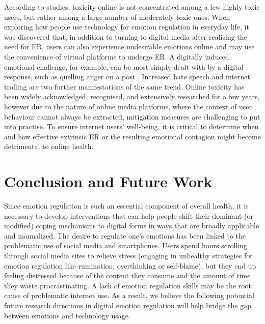 \documentclass[lettersize,journal]{IEEEtran}
\begin{document}
According to studies, toxicity online is not concentrated among a few highly toxic users, but rather among a large number of moderately toxic ones. When exploring how people use technology for emotion regulation in everyday life, it was discovered that, in addition to turning to digital media after realising the need for ER, users can also experience undesirable emotions online and may use the convenience of virtual platforms to undergo ER. A digitally induced emotional challenge, for example, can be most simply dealt with by a digital response, such as quelling anger on a post \cite{smith2022digital}. Increased hate speech and internet trolling are two further manifestations of the same trend. Online toxicity has been widely acknowledged, recognised, and extensively researched for a few years, however due to the nature of online media platforms, where the context of user behaviour cannot always be extracted, mitigation measures are challenging to put into practise. To ensure internet users' well-being, it is critical to determine when and how effective extrinsic ER or the resulting emotional contagion might become detrimental to online health.





 




\section{Conclusion and Future Work}
Since emotion regulation is such an essential component of overall health, it is necessary to develop interventions that can help people shift their dominant (or modified) coping mechanisms to digital forms in ways that are broadly applicable and manualized. The desire to regulate one's emotions has been linked to the problematic use of social media and smartphones. Users spend hours scrolling through social media sites to relieve stress (engaging in unhealthy strategies for emotion regulation like rumination, overthinking or self-blame), but they end up feeling distressed because of the content they consume and the amount of time they waste procrastinating. A lack of emotion regulation skills may be the root cause of problematic internet use. As a result, we believe the following potential future research directions in digital emotion regulation will help bridge the gap between emotions and technology usage.
  
\end{document}
